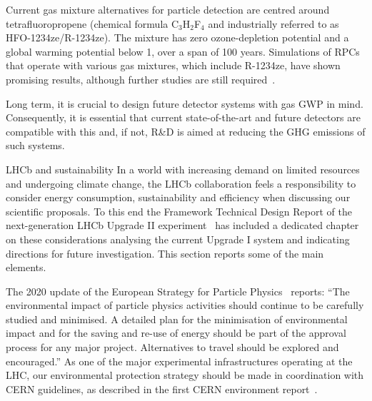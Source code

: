\documentclass[../SustainableHEP.tex]{subfiles}
\begin{document}
Current gas mixture alternatives for particle detection are centred around tetrafluoropropene (chemical formula C$_3$H$_2$F$_4$ and industrially referred to as HFO-1234ze/R-1234ze). The mixture has zero ozone-depletion potential and a global warming potential below 1, over a span of 100 years. Simulations of RPCs that operate with various gas mixtures, which include R-1234ze, have shown promising results, although further studies are still required~\cite{Fan:2022azj_ref3,Proto:2021taf_ref4}.

Long term, it is crucial to design future detector systems with gas GWP in mind. Consequently, it is essential that current state-of-the-art and future detectors are compatible with this and, if not, R\&D is aimed at reducing the GHG emissions of such systems.

\begin{casestudy}{LHCb and sustainability}%
\noindent In a world with increasing demand on limited resources and undergoing climate change, the LHCb collaboration feels a responsibility to consider energy consumption, sustainability and efficiency when discussing our scientific proposals. To this end the Framework Technical Design Report of the next-generation LHCb Upgrade II experiment~\cite{LHCbU2FTDR} has included a dedicated chapter on these considerations analysing the current Upgrade I system and indicating directions for future investigation. This section reports some of the main elements.  

The 2020 update of the European Strategy for Particle Physics~\cite{EuropeanStrategy2020} reports: ``The environmental impact of particle physics activities should continue to be carefully studied and minimised. A detailed plan for the minimisation of environmental impact and for the saving and re-use of energy should be part of the approval process for any major project. Alternatives to travel should be explored and encouraged.'' 
As one of the major experimental infrastructures operating at the LHC,  our environmental protection strategy should be made in coordination with CERN guidelines, as described in the first CERN environment report~\cite{envrep2020}.


\end{casestudy}
\end{document}
